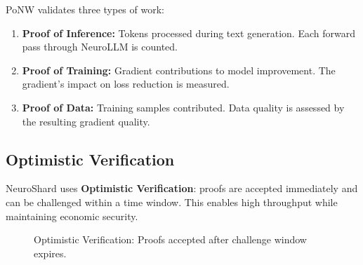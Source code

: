 \documentclass[11pt,a4paper]{article}
\begin{document}
PoNW validates three types of work:

    \begin{enumerate}
    \item \textbf{Proof of Inference:} Tokens processed during text generation. Each forward pass through NeuroLLM is counted.
    \item \textbf{Proof of Training:} Gradient contributions to model improvement. The gradient's impact on loss reduction is measured.
    \item \textbf{Proof of Data:} Training samples contributed. Data quality is assessed by the resulting gradient quality.
    \end{enumerate}

\subsection{Optimistic Verification}

NeuroShard uses \textbf{Optimistic Verification}: proofs are accepted immediately and can be challenged within a time window. This enables high throughput while maintaining economic security.

\begin{figure}[H]
\centering
{}
\caption{Optimistic Verification: Proofs accepted after challenge window expires.}
\label{fig:optimistic-ponw}
\end{figure}
\end{document}
